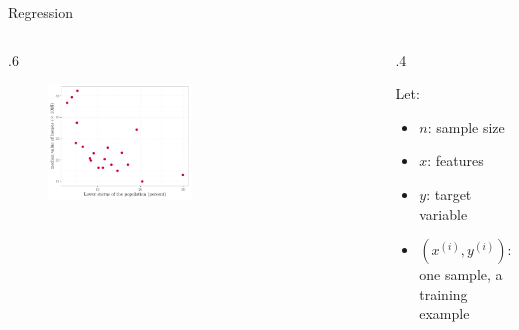 \documentclass[
  9pt,
  ignorenonframetext,
  aspectratio=169,
  t, dvipsnames]{beamer}
\providecommand{\tightlist}{%
  \setlength{\itemsep}{0pt}\setlength{\parskip}{0pt}}\usepackage{longtable,booktabs,array}
\theoremstyle{definition}
\def\begincols{\begin{columns}}
\def\begincol{\begin{column}}
\def\endcol{\end{column}}
\def\endcols{\end{columns}}
\begin{document}
\begin{frame}{Regression}
\protect\hypertarget{regression}{}
\begincols

\begincol{.6\textwidth}

\begin{figure}

{\centering \includegraphics[width=0.5\textwidth,height=\textheight]{CM1_Machine_Learning_files/figure-beamer/unnamed-chunk-7-1.pdf}

}

\end{figure}

\endcol
\begincol{.4\textwidth}

Let:

\begin{itemize}
\tightlist
\item
  \(n\): sample size
\item
  \(x\): features
\item
  \(y\): target variable
\item
  \((x^{(i)},y^{(i)})\): one sample, a training example
\end{itemize}

\endcol
\endcols
\end{frame}
\end{document}
